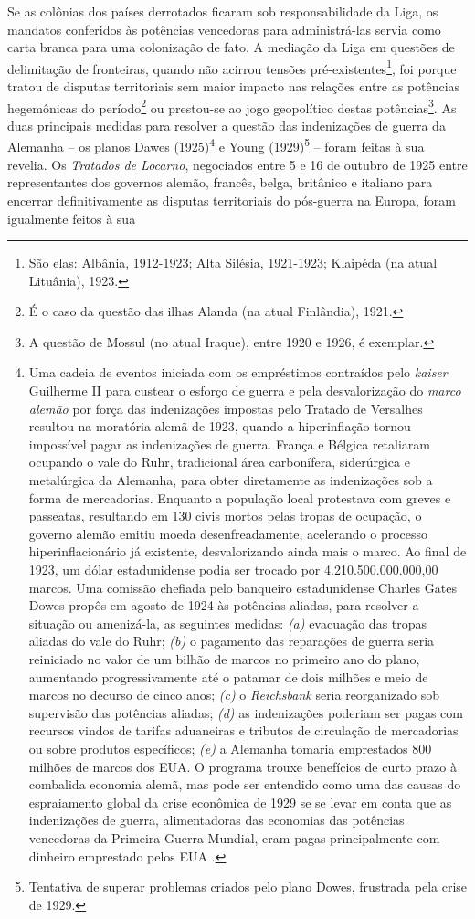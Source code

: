 Se as colônias dos países derrotados ficaram sob responsabilidade da Liga, os mandatos conferidos às potências vencedoras para administrá-las servia como carta branca para uma colonização de fato. A mediação da Liga em questões de delimitação de fronteiras, quando não acirrou tensões pré-existentes\footnote{São elas: Albânia, 1912-1923; Alta Silésia, 1921-1923; Klaipéda (na atual Lituânia), 1923.}, foi porque tratou de disputas territoriais sem maior impacto nas relações entre as potências hegemônicas do período\footnote{É o caso da questão das ilhas Alanda (na atual Finlândia), 1921.} ou prestou-se ao jogo geopolítico destas potências\footnote{A questão de Mossul (no atual Iraque), entre 1920 e 1926, é exemplar.}. As duas principais medidas para resolver a questão das indenizações de guerra da Alemanha -- os planos Dawes (1925)\footnote{Uma cadeia de eventos iniciada com os empréstimos contraídos pelo \textit{kaiser} Guilherme II para custear o esforço de guerra e pela desvalorização do \textit{marco alemão} por força das indenizações impostas pelo Tratado de Versalhes resultou na moratória alemã de 1923, quando a hiperinflação tornou impossível pagar as indenizações de guerra. França e Bélgica retaliaram ocupando o vale do Ruhr, tradicional área carbonífera, siderúrgica e metalúrgica da Alemanha, para obter diretamente as indenizações sob a forma de mercadorias. Enquanto a população local protestava com greves e passeatas, resultando em 130 civis mortos pelas tropas de ocupação, o governo alemão emitiu moeda desenfreadamente, acelerando o processo hiperinflacionário já existente, desvalorizando ainda mais o marco. Ao final de 1923, um dólar estadunidense podia ser trocado por 4.210.500.000.000,00 marcos. Uma comissão chefiada pelo banqueiro estadunidense Charles Gates Dowes propôs em agosto de 1924 às potências aliadas, para resolver a situação ou amenizá-la, as seguintes medidas: \textit{(a)} evacuação das tropas aliadas do vale do Ruhr; \textit{(b)} o pagamento das reparações de guerra seria reiniciado no valor de um bilhão de marcos no primeiro ano do plano, aumentando progressivamente até o patamar de dois milhões e meio de marcos no decurso de cinco anos; \textit{(c)} o \textit{Reichsbank} seria reorganizado sob supervisão das potências aliadas; \textit{(d)} as indenizações poderiam ser pagas com recursos vindos de tarifas aduaneiras e tributos de circulação de mercadorias ou sobre produtos específicos; \textit{(e)} a Alemanha tomaria emprestados 800 milhões de marcos dos EUA. O programa trouxe benefícios de curto prazo à combalida economia alemã, mas pode ser entendido como uma das causas do espraiamento global da crise econômica de 1929 se se levar em conta que as indenizações de guerra, alimentadoras das economias das potências vencedoras da Primeira Guerra Mundial, eram pagas principalmente com dinheiro emprestado pelos EUA \cite[p.~85]{carr_relations_1937}.} e Young (1929)\footnote{Tentativa de superar problemas criados pelo plano Dowes, frustrada pela crise de 1929.} -- foram feitas à sua revelia. Os \textit{Tratados de Locarno}, negociados entre 5 e 16 de outubro de 1925 entre representantes dos governos alemão, francês, belga, britânico e italiano para encerrar definitivamente as disputas territoriais do pós-guerra na Europa, foram igualmente feitos à sua 